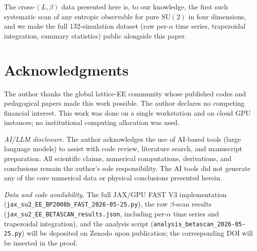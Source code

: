 \documentclass[11pt,a4paper]{article}
\theoremstyle{definition}
\newcommand{\SUtwo}{\mathrm{SU}(2)}
\begin{document}
The cross-$(L,\beta)$ data presented here is, to our knowledge, the
first such systematic scan of any entropic observable for pure
$\SUtwo$ in four dimensions, and we make the full
$132$-simulation dataset (raw per-$\alpha$ time series, trapezoidal
integration, summary statistics) public alongside this paper.

\section*{Acknowledgments}
The author thanks the global lattice-EE community whose published
codes and pedagogical papers made this work possible. The author
declares no competing financial interest. This work was done on a
single workstation and on cloud GPU instances; no institutional
computing allocation was used.

\medskip
\noindent\emph{AI/LLM disclosure.}
The author acknowledges the use of AI-based tools (large language
models) to assist with code review, literature search, and
manuscript preparation. All scientific claims, numerical
computations, derivations, and conclusions remain the author's sole
responsibility. The AI tools did not generate any of the core
numerical data or physical conclusions presented herein.

\medskip
\noindent\emph{Data and code availability.}
The full JAX/GPU FAST V3 implementation
(\verb!jax_su2_EE_BP2008b_FAST_2026-05-25.py!), the raw $\beta$-scan
results (\verb!jax_su2_EE_BETASCAN_results.json!, including per-$\alpha$
time series and trapezoidal integration), and the analysis script
(\verb!analysis_betascan_2026-05-25.py!) will be deposited on Zenodo
upon publication; the corresponding DOI will be inserted in the proof.
\end{document}
